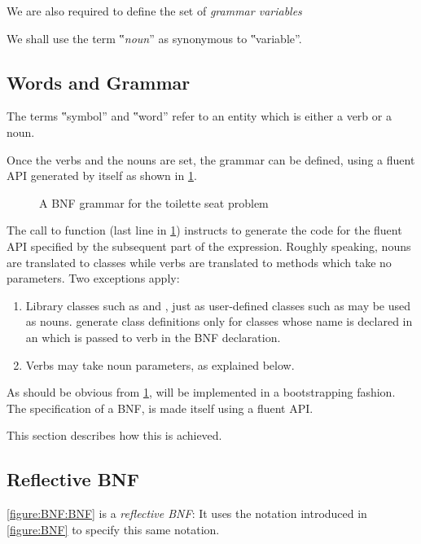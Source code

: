 We are also required to define the set of \emph{grammar variables}
\begin{quote}
\end{quote}

We shall use the term ‟\emph{noun}” as synonymous to ‟variable”.

\subsection{Words and Grammar}
The terms ‟symbol” and ‟word” refer to an entity which is either
a verb or a noun.

Once the verbs and the nouns are set, the grammar can be defined,
using a fluent API generated by \Fajita itself as shown
in \cref{figure:fluent}.

\begin{figure}
  \caption{A BNF grammar for the toilette seat problem}
  \label{figure:fluent}
\end{figure}

The call to function  (last line in \cref{figure:fluent}) instructs
\Fajita to generate the code for the fluent API specified by the
subsequent part of the expression.
Roughly speaking, nouns are translated to classes while verbs are translated to methods which
take no parameters.
Two exceptions apply:
\begin{enumerate}
  \item
        Library classes such as  and , just as user-defined
        classes such as  may be used as nouns.
        \Fajita generate class definitions only for classes whose name is declared
        in an  which is passed to  verb in the BNF declaration.
  \item Verbs may take noun parameters, as explained below.
\end{enumerate}

As should be obvious from \cref{figure:fluent}, \Fajita will be implemented
in a bootstrapping fashion.
The specification of a BNF, is made itself using a fluent API.

This section describes how this is achieved.

\subsection{Reflective BNF}
\cref{figure:BNF:BNF} is a \emph{reflective BNF}:
It uses the notation introduced in \cref{figure:BNF}
to specify this same notation.

